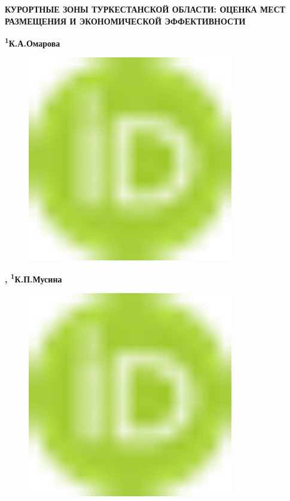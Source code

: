 
{\bfseries КУРОРТНЫЕ ЗОНЫ ТУРКЕСТАНСКОЙ ОБЛАСТИ: ОЦЕНКА МЕСТ РАЗМЕЩЕНИЯ И
ЭКОНОМИЧЕСКОЙ ЭФФЕКТИВНОСТИ}

{\bfseries \textsuperscript{1}К.А.Омарова}
\begin{figure}[H]
	\centering
	\includegraphics[width=0.8\textwidth]{media/ekon/image1}
	\caption*{}
\end{figure}
{\bfseries \textsuperscript{\envelope },
\textsuperscript{1}К.П.Мусина}
\begin{figure}[H]
	\centering
	\includegraphics[width=0.8\textwidth]{media/ekon/image1}
	\caption*{}
\end{figure}

